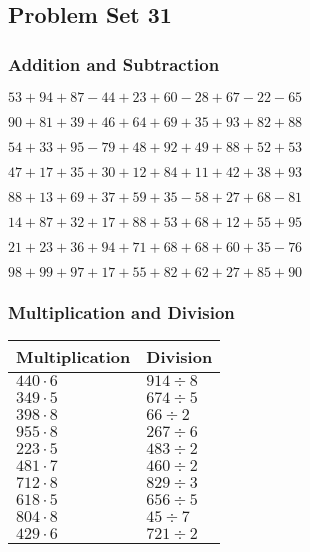 \hypertarget{problem-set-31}{%
\subsection{Problem Set 31}\label{problem-set-31}}

\hypertarget{addition-and-subtraction}{%
\subsubsection{Addition and
Subtraction}\label{addition-and-subtraction}}

\(53+94+87-44+23+60-28+67-22-65\)

\(90+81+39+46+64+69+35+93+82+88\)

\(54+33+95-79+48+92+49+88+52+53\)

\(47+17+35+30+12+84+11+42+38+93\)

\(88+13+69+37+59+35-58+27+68-81\)

\(14+87+32+17+88+53+68+12+55+95\)

\(21+23+36+94+71+68+68+60+35-76\)

\(98+99+97+17+55+82+62+27+85+90\)

\hypertarget{multiplication-and-division}{%
\subsubsection{Multiplication and
Division}\label{multiplication-and-division}}

\begin{longtable}[]{@{}ll@{}}
\toprule
Multiplication & Division\tabularnewline
\midrule
\endhead
\(440\cdot6\) & \(914÷8\)\tabularnewline
\(349\cdot5\) & \(674÷5\)\tabularnewline
\(398\cdot8\) & \(66÷2\)\tabularnewline
\(955\cdot8\) & \(267÷6\)\tabularnewline
\(223\cdot5\) & \(483÷2\)\tabularnewline
\(481\cdot7\) & \(460÷2\)\tabularnewline
\(712\cdot8\) & \(829÷3\)\tabularnewline
\(618\cdot5\) & \(656÷5\)\tabularnewline
\(804\cdot8\) & \(45÷7\)\tabularnewline
\(429\cdot6\) & \(721÷2\)\tabularnewline
\bottomrule
\end{longtable}
